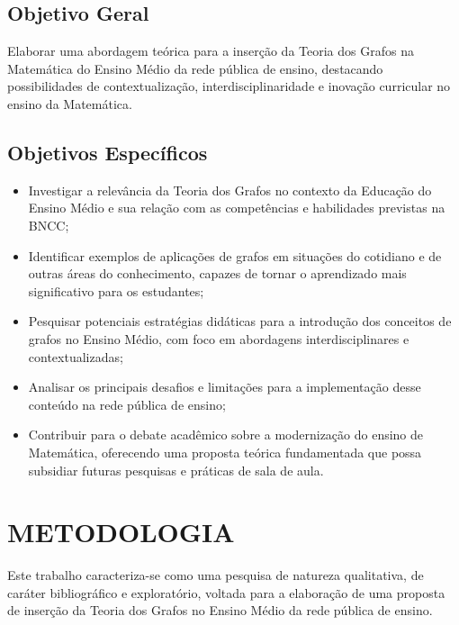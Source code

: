 \documentclass[
  12pt,
  oneside,
  a4paper,
  english,
  brazilian
  ]{abntex2}
\theoremstyle{definition}
\begin{document}
\section{Objetivo Geral}

Elaborar uma abordagem teórica para a inserção da Teoria dos Grafos na Matemática
do Ensino Médio da rede pública de ensino, destacando possibilidades de
contextualização, interdisciplinaridade e inovação curricular no ensino da
Matemática.

\section{Objetivos Específicos}

\begin{itemize}
  \item Investigar a relevância da Teoria dos Grafos no contexto da Educação do
        Ensino Médio e sua relação com as competências e habilidades previstas na
        BNCC;
 \item Identificar exemplos de aplicações de grafos em situações do cotidiano e
        de outras áreas do conhecimento, capazes de tornar o aprendizado mais
        significativo para os estudantes;
 \item Pesquisar potenciais estratégias didáticas para a introdução dos conceitos
        de grafos no Ensino Médio, com foco em abordagens interdisciplinares e
        contextualizadas;
 \item Analisar os principais desafios e limitações para a implementação desse
        conteúdo na rede pública de ensino;
 \item Contribuir para o debate acadêmico sobre a modernização do ensino de
        Matemática, oferecendo uma proposta teórica fundamentada que possa
        subsidiar futuras pesquisas e práticas de sala de aula.
 \end{itemize}

\chapter{METODOLOGIA}

Este trabalho caracteriza-se como uma pesquisa de natureza qualitativa, de
caráter bibliográfico e exploratório, voltada para a elaboração de uma proposta
de inserção da Teoria dos Grafos no Ensino Médio da rede pública de ensino.
\end{document}

